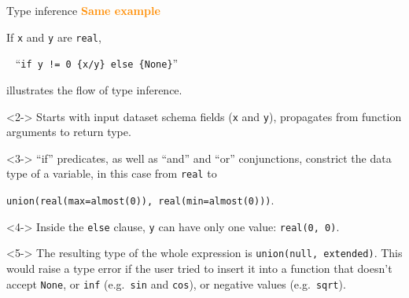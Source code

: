 \documentclass{beamer}
\begin{document}
\begin{frame}{Type inference}
\vspace{0.3 cm}
\textcolor{darkorange}{\bf Same example}

If {\tt x} and {\tt y} are {\tt real},

\vspace{0.2 cm}
\mbox{ } \hfill ``{\tt if y != 0 \{x/y\} else \{None\}}'' \hfill \mbox{ }

\vspace{0.2 cm}
illustrates the flow of type inference.

\vspace{0.3 cm}
\begin{uncoverenv}<2->
Starts with input dataset schema fields ({\tt x} and {\tt y}), propagates from function arguments to return type.
\end{uncoverenv}

\vspace{0.3 cm}
\begin{uncoverenv}<3->
``if'' predicates, as well as ``and'' and ``or'' conjunctions, constrict the data type of a variable, in this case from {\tt real} to

\mbox{\tt union(real(max=almost(0)), real(min=almost(0)))}.
\end{uncoverenv}

\begin{uncoverenv}<4->
\vspace{-0.2 cm}
Inside the {\tt else} clause, {\tt y} can have only one value: {\tt real(0, 0)}.
\end{uncoverenv}

\begin{uncoverenv}<5->
\vspace{-0.2 cm}
The resulting type of the whole expression is {\tt union(null, extended)}. This would raise a type error if the user tried to insert it into a function that doesn't accept {\tt None}, or {\tt inf} (e.g.\ {\tt sin} and {\tt cos}), or negative values (e.g.\ {\tt sqrt}).
\end{uncoverenv}
\end{frame}
\end{document}
